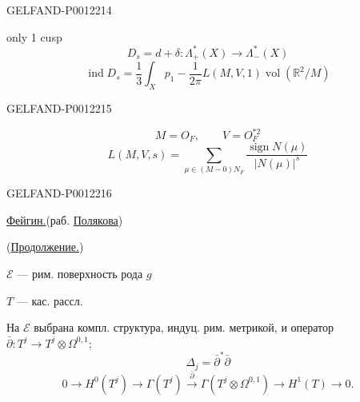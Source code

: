 \begin{GelfandAdjacentEvidence}{GELFAND-P001221}{4}


only 1 cusp
\begin{equation*}
D_s=d+\delta:\Lambda^*_+(X)\longrightarrow\Lambda^*_-(X)
\end{equation*}
\begin{equation*}
\operatorname{ind}D_s=\frac13\int_X p_1-\frac1{2\pi}L(M,V,1)\operatorname{vol}(\mathbb R^2/M)
\end{equation*}
\end{GelfandAdjacentEvidence}
\begin{GelfandAdjacentEvidence}{GELFAND-P001221}{5}

\begin{equation*}
M=O_F,\qquad V=O_F^{*2}
\end{equation*}
\begin{equation*}
L(M,V,s)=\sum_{\mu\in(M-0)N_F}\frac{\operatorname{sign}N(\mu)}{|N(\mu)|^s}
\end{equation*}
\end{GelfandAdjacentEvidence}
\begin{GelfandAdjacentEvidence}{GELFAND-P001221}{6}


\underline{\underline{Фейгин.}}\qquad{}\qquad(раб. \underline{Полякова})

(\underline{Продолжение.})

\(\mathcal E\) --- рим. поверхность рода \(g\)

\(T\) --- кас. рассл.

На \(\mathcal E\) выбрана компл. структура, индуц. рим. метрикой, и оператор \(\bar\partial:T^j\longrightarrow T^j\otimes\Omega^{0,1}\);
\begin{equation*}
\Delta_j=\bar\partial^*\bar\partial
\end{equation*}
\begin{equation*}
0\longrightarrow H^0(T^j)\longrightarrow\Gamma(T^j)
\overset{\bar\partial}{\longrightarrow}\Gamma(T^j\otimes\Omega^{0,1})
\longrightarrow H^1(T)\longrightarrow0.\tag{1}
\end{equation*}
\end{GelfandAdjacentEvidence}



